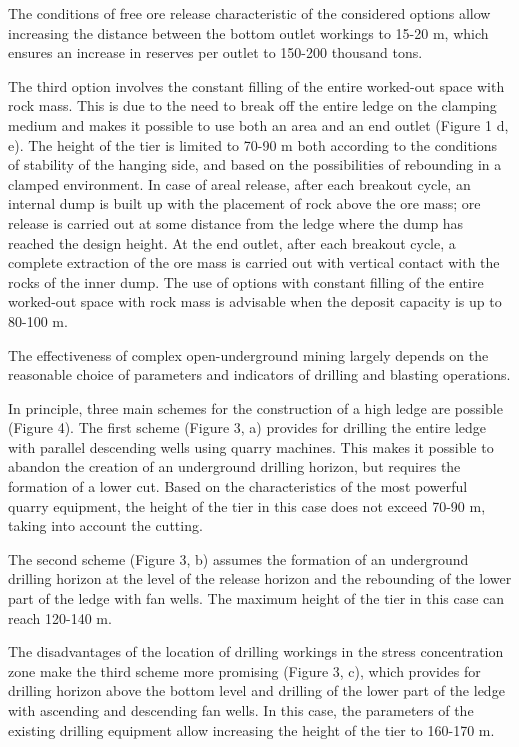 \begin{multicols}{2}
The conditions of free ore release characteristic of the considered
options allow increasing the distance between the bottom outlet workings
to 15-20 m, which ensures an increase in reserves per outlet to 150-200
thousand tons.

The third option involves the constant filling of the entire worked-out
space with rock mass. This is due to the need to break off the entire
ledge on the clamping medium and makes it possible to use both an area
and an end outlet (Figure 1 d, e). The height of the tier is limited to
70-90 m both according to the conditions of stability of the hanging
side, and based on the possibilities of rebounding in a clamped
environment. In case of areal release, after each breakout cycle, an
internal dump is built up with the placement of rock above the ore mass;
ore release is carried out at some distance from the ledge where the
dump has reached the design height. At the end outlet, after each
breakout cycle, a complete extraction of the ore mass is carried out
with vertical contact with the rocks of the inner dump. The use of
options with constant filling of the entire worked-out space with rock
mass is advisable when the deposit capacity is up to 80-100 m.

The effectiveness of complex open-underground mining largely depends on
the reasonable choice of parameters and indicators of drilling and
blasting operations.

In principle, three main schemes for the construction of a high ledge
are possible (Figure 4). The first scheme (Figure 3, a) provides for
drilling the entire ledge with parallel descending wells using quarry
machines. This makes it possible to abandon the creation of an
underground drilling horizon, but requires the formation of a lower cut.
Based on the characteristics of the most powerful quarry equipment, the
height of the tier in this case does not exceed 70-90 m, taking into
account the cutting.

The second scheme (Figure 3, b) assumes the formation of an underground
drilling horizon at the level of the release horizon and the rebounding
of the lower part of the ledge with fan wells. The maximum height of the
tier in this case can reach 120-140 m.

The disadvantages of the location of drilling workings in the stress
concentration zone make the third scheme more promising (Figure 3, c),
which provides for drilling horizon above the bottom level and drilling
of the lower part of the ledge with ascending and descending fan wells.
In this case, the parameters of the existing drilling equipment allow
increasing the height of the tier to 160-170 m.


\end{multicols}
